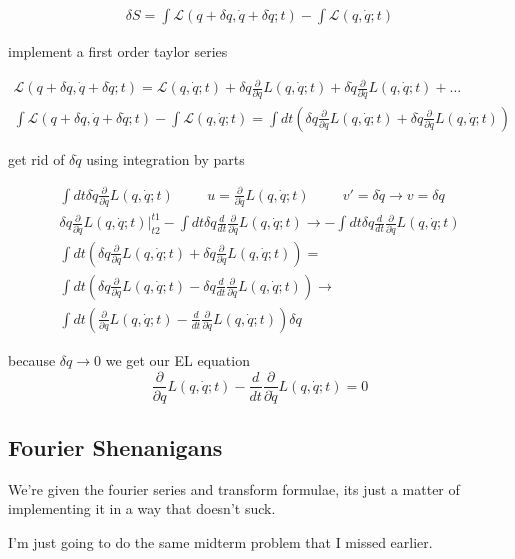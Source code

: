 \documentclass[fleqn]{article}
\newcommand{\hp}{\hspace{1cm}}
\newcommand{\del}{\partial}
\newcommand{\equations} [1] {
\begin{gather*}
#1
\end{gather*}
}
\begin{document}
\equations{
    \delta S = 
    \int \mathcal L(q + \delta q, \dot q + \delta \dot q; t) - 
    \int \mathcal L(q, \dot q; t)
}
implement a first order taylor series 
\equations{
     \mathcal L(q + \delta q, \dot q + \delta \dot q; t)
    =
    \mathcal L(q, \dot q; t) + \delta q \frac{\del}{\del q} L(q, \dot q; t)
    + \delta \dot q \frac{\del}{\del \dot q} L(q, \dot q; t) + \ldots 
    \\
    \int \mathcal L(q + \delta q, \dot q + \delta \dot q; t) - 
    \int \mathcal L(q, \dot q; t)
    =
    \int dt (
    \delta q \frac{\del}{\del q} L(q, \dot q; t)
    + \delta \dot q \frac{\del}{\del \dot q} L(q, \dot q; t))
}
get rid of $\delta \dot q$ using integration by parts 
\equations{
    \int dt \delta \dot q \frac{\del}{\del \dot q} L(q, \dot q; t)
    \hp 
    u = \frac{\del}{\del \dot q} L(q, \dot q; t)
    \hp 
    v' = \delta \dot q \rightarrow v = \delta q 
    \\
    \delta q \frac{\del}{\del \dot q} L(q, \dot q; t)
    \Big|^{t1}_{t2}
    -
    \int dt 
    \delta q \frac{d}{dt} \frac{\del}{\del \dot q} L(q, \dot q; t)
    \rightarrow 
    -
    \int dt 
    \delta q \frac{d}{dt} \frac{\del}{\del \dot q} L(q, \dot q; t)
    \\
    \int dt (
    \delta q \frac{\del}{\del q} L(q, \dot q; t)
    + \delta \dot q \frac{\del}{\del \dot q} L(q, \dot q; t))
    =
    \\
    \int dt (
    \delta q \frac{\del}{\del q} L(q, \dot q; t)
    -
    \delta q \frac{d}{dt} \frac{\del}{\del \dot q} L(q, \dot q; t)
    )
    \rightarrow 
    \\
    \int dt (
    \frac{\del}{\del q} L(q, \dot q; t)
    -
    \frac{d}{dt} \frac{\del}{\del \dot q} L(q, \dot q; t)
    )
    \delta q
}
because $\delta q \to 0$ we get our EL equation 
\[
    \frac{\del}{\del q} L(q, \dot q; t)
    -
    \frac{d}{dt} \frac{\del}{\del \dot q} L(q, \dot q; t)
    =
    0
\]



\subsection{Fourier Shenanigans}
We're given the fourier series and transform formulae, its just a matter of 
implementing it in a way that doesn't suck.

I'm just going to do the same midterm problem that I missed earlier.
\end{document}
